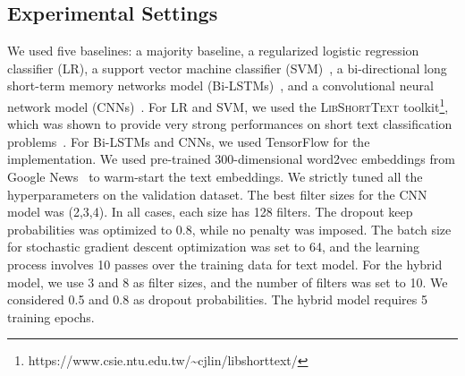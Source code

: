 \documentclass[11pt,a4paper]{article}
\begin{document}
\subsection{Experimental Settings}
We used five baselines: a majority baseline, a regularized logistic regression classifier (LR), a support vector machine classifier (SVM)~\cite{crammer2001algorithmic}, a bi-directional long short-term memory networks model (Bi-LSTMs)~\cite{hochreiter1997long,graves2005framewise}, and a convolutional neural network model (CNNs)~\cite{kim:2014:EMNLP2014}. For LR and SVM, we used the \textsc{LibShortText} toolkit\footnote{https://www.csie.ntu.edu.tw/\~{}cjlin/libshorttext/}, which was shown to provide very strong performances on short text classification problems~\cite{Wang:2015:EMNLP}. For Bi-LSTMs and CNNs, we used TensorFlow for the implementation. We used pre-trained 300-dimensional word2vec embeddings from Google News~\cite{mikolov2013efficient} to warm-start the text embeddings. We strictly tuned all the hyperparameters on the validation dataset. The best filter sizes for the CNN model was (2,3,4). In all cases, each size has 128 filters. The dropout keep probabilities was optimized to 0.8, while no  penalty was imposed. The batch size for stochastic gradient descent optimization was set to 64, and the learning process involves 10 passes over the training data for text model. For the hybrid model, we use 3 and 8 as filter sizes, and the number of filters was set to 10. We considered 0.5 and 0.8 as dropout probabilities. The hybrid model requires 5 training epochs. 
\end{document}
